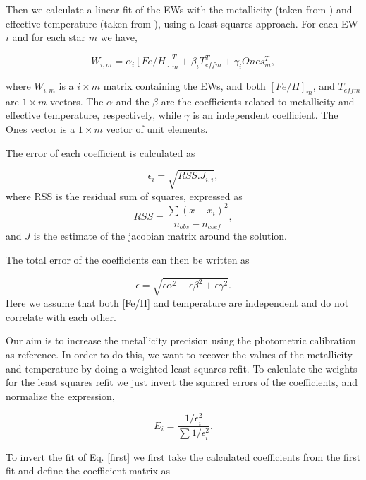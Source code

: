 \documentclass[structabstract]{aa}
\begin{document}
Then we calculate a linear fit of the EWs with the metallicity (taken from \citet{Neves-2012}) and effective temperature (taken from \citet{Casagrande-2008}), using a least squares approach. For each EW $i$ and for each star $m$ we have,

\begin{equation}
W_{i,m} = \alpha_{i}[Fe/H]_{m}^{T} + \beta_{i}T_{eff m}^{T} + \gamma_{i}Ones_{m}^{T},
\label{first}
\end{equation}


where $W_{i,m}$ is a $i\times m$ matrix containing the EWs, and both $[Fe/H]_{m}$, and $T_{eff m}$ are $1\times m$ vectors. The $\alpha$ and the $\beta$ are the coefficients related to metallicity and effective temperature, respectively, while $\gamma$ is an independent coefficient. The Ones vector is a $1\times m$ vector of unit elements.

The error of each coefficient is calculated as

\begin{equation}
\epsilon_{i} = \sqrt{RSS.J_{i,i}},
\end{equation}
where RSS is the residual sum of squares, expressed as
\begin{equation}
RSS = \frac{\sum{(x-x_{i})^{2}}}{n_{obs}-n_{coef}},
\end{equation}
and $J$ is the estimate of the jacobian matrix around the solution. 

The total error of the coefficients can then be written as 

\begin{equation} 
\epsilon = \sqrt{\epsilon\alpha^{2}+\epsilon\beta^{2}+\epsilon\gamma^{2}}.
\end{equation}
Here we assume that both [Fe/H] and temperature are independent and do not correlate with each other. 

Our aim is to increase the metallicity precision using the photometric calibration as reference. In order to do this, we want to recover the values of the metallicity and temperature by doing a weighted least squares refit. To calculate the weights for the least squares refit we just invert the squared errors of the coefficients, and normalize the expression,

\begin{equation}
E_{i} = \frac{1/\epsilon_{i}^{2}}{\sum{1/\epsilon_{i}^{2}}}.
\label{weight}
\end{equation}

To invert the fit of Eq. \ref{first} we first take the calculated coefficients from the first fit and define the coefficient matrix as
\end{document}
